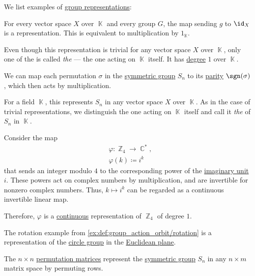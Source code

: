 \begin{example}\label{ex:def:group_representation}
  We list examples of \hyperref[def:group_representation]{group representations}:
  \begin{thmenum}
     For every vector space \( X \) over \( \BbbK \) and every group \( G \), the map sending \( g \) to \( \id_X \) is a representation. This is equivalent to multiplication by \( 1_\BbbK \).

    Even though this representation is trivial for any vector space \( X \) over \( \BbbK \), only one of the is called \emph{the}  --- the one acting on \( \BbbK \) itself. It has \hyperref[def:group_representation_degree]{degree} \( 1 \) over \( \BbbK \).

     We can map each permutation \( \sigma \) in the \hyperref[def:symmetric_group]{symmetric group} \( S_n \) to its \hyperref[def:permutation_parity]{parity} \( \sgn(\sigma) \), which then acts by multiplication.

    For a field \( \BbbK \), this represents \( S_n \) in any vector space \( X \) over \( \BbbK \). As in the case of trivial representations, we distinguish the one acting on \( \BbbK \) itself and call it \emph{the}  of \( S_n \) in \( \BbbK \).

     Consider the map
    \begin{equation*}
      \begin{aligned}
        &\varphi: \BbbZ_4 \to \BbbC^*, \\
        &\varphi(k) \coloneqq i^k
      \end{aligned}
    \end{equation*}
    that sends an integer modulo \( 4 \) to the corresponding power of the \hyperref[def:complex_numbers]{imaginary unit} \( i \). These powers act on complex numbers by multiplication, and are invertible for nonzero complex numbers. Thus, \( k \mapsto i^k \) can be regarded as a continuous invertible linear map.

    Therefore, \( \varphi \) is a \hyperref[def:continuous_group_representation]{continuous} representation of \( \BbbZ_4 \) of degree \( 1 \).

     The rotation example from \cref{ex:def:group_action_orbit/rotation} is a representation of the \hyperref[def:circle_group]{circle group} in the \hyperref[def:euclidean_plane]{Euclidean plane}.

     The \( n \times n \) \hyperref[def:elementary_matrix/permutation]{permutation matrices} represent the \hyperref[def:symmetric_group]{symmetric group} \( S_n \) in any \( n \times m \) matrix space by permuting rows.
  \end{thmenum}
\end{example}

